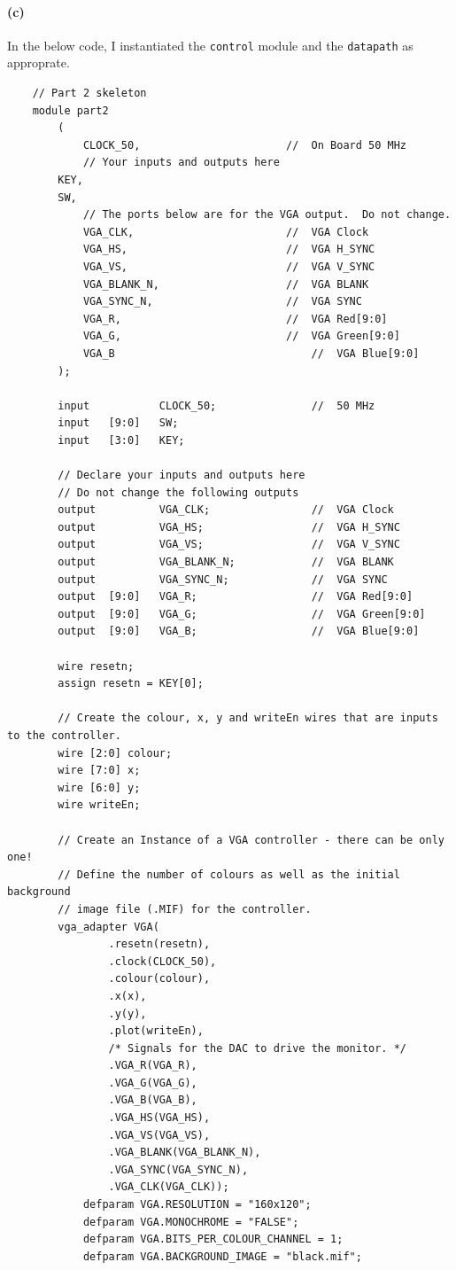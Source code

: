 \documentclass{article}
\begin{document}
\paragraph{(c)} In the below code, I instantiated the \texttt{control} module and the \texttt{datapath} as approprate.
\begin{verbatim}
    // Part 2 skeleton
    module part2
        (
            CLOCK_50,						//	On Board 50 MHz
            // Your inputs and outputs here
        KEY,
        SW,
            // The ports below are for the VGA output.  Do not change.
            VGA_CLK,   						//	VGA Clock
            VGA_HS,							//	VGA H_SYNC
            VGA_VS,							//	VGA V_SYNC
            VGA_BLANK_N,					//	VGA BLANK
            VGA_SYNC_N,						//	VGA SYNC
            VGA_R,   						//	VGA Red[9:0]
            VGA_G,	 						//	VGA Green[9:0]
            VGA_B   							//	VGA Blue[9:0]
        );

        input			CLOCK_50;				//	50 MHz
        input   [9:0]   SW;
        input   [3:0]   KEY;

        // Declare your inputs and outputs here
        // Do not change the following outputs
        output			VGA_CLK;   				//	VGA Clock
        output			VGA_HS;					//	VGA H_SYNC
        output			VGA_VS;					//	VGA V_SYNC
        output			VGA_BLANK_N;			//	VGA BLANK
        output			VGA_SYNC_N;				//	VGA SYNC
        output	[9:0]	VGA_R;   				//	VGA Red[9:0]
        output	[9:0]	VGA_G;	 				//	VGA Green[9:0]
        output	[9:0]	VGA_B;   				//	VGA Blue[9:0]
        
        wire resetn;
        assign resetn = KEY[0];
        
        // Create the colour, x, y and writeEn wires that are inputs to the controller.
        wire [2:0] colour;
        wire [7:0] x;
        wire [6:0] y;
        wire writeEn;

        // Create an Instance of a VGA controller - there can be only one!
        // Define the number of colours as well as the initial background
        // image file (.MIF) for the controller.
        vga_adapter VGA(
                .resetn(resetn),
                .clock(CLOCK_50),
                .colour(colour),
                .x(x),
                .y(y),
                .plot(writeEn),
                /* Signals for the DAC to drive the monitor. */
                .VGA_R(VGA_R),
                .VGA_G(VGA_G),
                .VGA_B(VGA_B),
                .VGA_HS(VGA_HS),
                .VGA_VS(VGA_VS),
                .VGA_BLANK(VGA_BLANK_N),
                .VGA_SYNC(VGA_SYNC_N),
                .VGA_CLK(VGA_CLK));
            defparam VGA.RESOLUTION = "160x120";
            defparam VGA.MONOCHROME = "FALSE";
            defparam VGA.BITS_PER_COLOUR_CHANNEL = 1;
            defparam VGA.BACKGROUND_IMAGE = "black.mif";
                

\end{verbatim}
\end{document}
